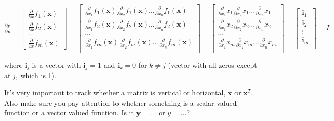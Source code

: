 \documentclass[11pt]{article}
\begin{document}
$
\frac{\partial \mathbf{y}}{\partial \mathbf{x}} = \begin{bmatrix}
\frac{\partial}{\partial {x}} f_1(\mathbf{x}) \\
\frac{\partial}{\partial {x}} f_2(\mathbf{x})\\
\ldots\\
\frac{\partial}{\partial {x}} f_m(\mathbf{x})
\end{bmatrix} = \begin{bmatrix}
\frac{\partial}{\partial {x_1}} f_1(\mathbf{x}) \frac{\partial}{\partial {x_2}} f_1(\mathbf{x}) \ldots \frac{\partial}{\partial {x_n}} f_1(\mathbf{x}) \\
\frac{\partial}{\partial {x_1}} f_2(\mathbf{x}) \frac{\partial}{\partial {x_2}} f_2(\mathbf{x}) \ldots \frac{\partial}{\partial {x_n}} f_2(\mathbf{x}) \\
\ldots\\
\frac{\partial}{\partial {x_1}} f_m(\mathbf{x}) \frac{\partial}{\partial {x_2}} f_m(\mathbf{x}) \ldots \frac{\partial}{\partial {x_n}} f_m(\mathbf{x}) \\
\end{bmatrix} = \begin{bmatrix}
\frac{\partial}{\partial {x_1}} x_1 \frac{\partial}{\partial {x_2}} x_1 \ldots \frac{\partial}{\partial {x_n}} x_1 \\
\frac{\partial}{\partial {x_1}} x_2 \frac{\partial}{\partial {x_2}} x_2 \ldots \frac{\partial}{\partial {x_n}} x_2 \\
\ldots\\
\frac{\partial}{\partial {x_1}} x_m \frac{\partial}{\partial {x_2}} x_m \ldots \frac{\partial}{\partial {x_n}} x_m \\
\end{bmatrix} = \begin{bmatrix}
           \mathbf{i}_1\\
           \mathbf{i}_2\\
           \vdots \\
           \mathbf{i}_m\\
           \end{bmatrix} = I
$

where $\mathbf{i}_j$ is a vector with $\mathbf{i}_j=1$ and $\mathbf{i}_k=0$ for $k \neq j$ (vector with all zeros except at $j$, which is 1).

It's very important to track whether a matrix is vertical or horizontal, $\mathbf{x}$ or $\mathbf{x}^T$. Also make sure you pay attention to whether something is a scalar-valued function or a vector valued function. Is it $\mathbf{y} = \ldots$ or $y = \ldots$?
\end{document}
